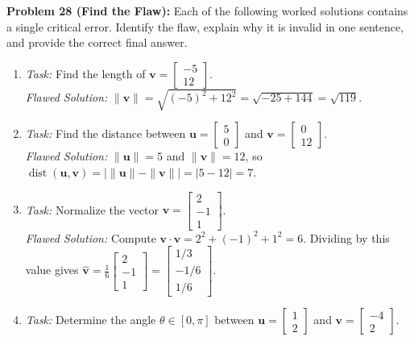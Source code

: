\documentclass[11pt, letterpaper]{article}
\theoremstyle{definition}
\theoremstyle{remark}
\begin{document}
\textbf{Problem 28 (Find the Flaw):} Each of the following worked solutions contains a single critical error. Identify the flaw, explain why it is invalid in one sentence, and provide the correct final answer.
\begin{enumerate}[label=(\alph*)]
    \item \textit{Task:} Find the length of $\mathbf{v} = \begin{bmatrix} -5 \\ 12 \end{bmatrix}$. \\
    \textit{Flawed Solution:} $\|\mathbf{v}\| = \sqrt{(-5)^2 + 12^2} = \sqrt{-25 + 144} = \sqrt{119}$.
    \item \textit{Task:} Find the distance between $\mathbf{u} = \begin{bmatrix} 5 \\ 0 \end{bmatrix}$ and $\mathbf{v} = \begin{bmatrix} 0 \\ 12 \end{bmatrix}$. \\
    \textit{Flawed Solution:} $\|\mathbf{u}\| = 5$ and $\|\mathbf{v}\| = 12$, so $\operatorname{dist}(\mathbf{u}, \mathbf{v}) = |\|\mathbf{u}\| - \|\mathbf{v}\|| = |5 - 12| = 7$.
    \item \textit{Task:} Normalize the vector $\mathbf{v} = \begin{bmatrix} 2 \\ -1 \\ 1 \end{bmatrix}$. \\
    \textit{Flawed Solution:} Compute $\mathbf{v} \cdot \mathbf{v} = 2^2 + (-1)^2 + 1^2 = 6$. Dividing by this value gives $\hat{\mathbf{v}} = \frac{1}{6}\begin{bmatrix} 2 \\ -1 \\ 1 \end{bmatrix} = \begin{bmatrix} 1/3 \\ -1/6 \\ 1/6 \end{bmatrix}$.
    \item \textit{Task:} Determine the angle $\theta \in [0, \pi]$ between $\mathbf{u} = \begin{bmatrix} 1 \\ 2 \end{bmatrix}$ and $\mathbf{v} = \begin{bmatrix} -4 \\ 2 \end{bmatrix}$. \\

\end{enumerate}
\end{document}
